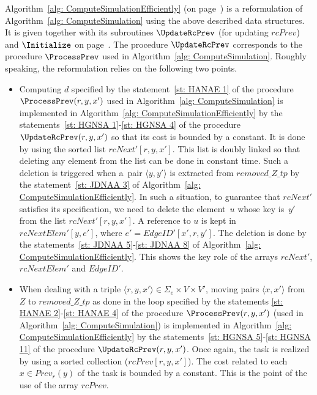 \documentclass[11pt]{article}
\def\tuple#1{\langle#1\rangle}
\newcommand{\SE}{\Sigma_e}
\newcommand{\Prev}{\mathit{Prev}}
\newcommand{\removeZ}{\textit{removed\_Z\_tp}}
\newcommand{\EdgeIDp}{\mathit{EdgeID}'}
\newcommand{\rcNextP}{\mathit{rcNext}'}
\newcommand{\rcPrev}{\mathit{rcPrev}}
\newcommand{\rcNextElemP}{\mathit{rcNextElem}'}
\begin{document}
Algorithm~\ref{alg: ComputeSimulationEfficiently} (on page~\pageref{alg: ComputeSimulationEfficiently}) is a reformulation of Algorithm~\ref{alg: ComputeSimulation} using the above described data structures. It is given together with its subroutines $\UpdateRcPrev$ (for updating $\rcPrev$) and $\Initialize$ on page~\pageref{alg: ComputeSimulationEfficiently}. The procedure $\UpdateRcPrev$ corresponds to the procedure $\ProcessPrev$ used in Algorithm~\ref{alg: ComputeSimulation}. 
%
Roughly speaking, the reformulation relies on the following two points.  
\begin{itemize}
\item Computing $d$ specified by the statement~\ref{st: HANAE 1} of the procedure $\ProcessPrev(r,y,x')$ used in Algorithm~\ref{alg: ComputeSimulation} is implemented in Algorithm~\ref{alg: ComputeSimulationEfficiently} by the statements~\ref{st: HGNSA 1}-\ref{st: HGNSA 4} of the procedure $\UpdateRcPrev(r,y,x')$ so that its cost is bounded by a constant. It is done by using the sorted list $\rcNextP[r,y,x']$. This list is doubly linked so that deleting any element from the list can be done in constant time. Such a deletion is triggered when a~pair $\tuple{y,y'}$ is extracted from $\removeZ$ by the statement~\ref{st: JDNAA 3} of Algorithm~\ref{alg: ComputeSimulationEfficiently}. In such a situation, to guarantee that $\rcNextP$ satisfies its specification, we need to delete the element~$u$ whose key is~$y'$ from the list $\rcNextP[r,y,x']$. A reference to $u$ is kept in $\rcNextElemP[y,e']$, where $e' = \EdgeIDp[x',r,y']$. The deletion is done by the statements~\ref{st: JDNAA 5}-\ref{st: JDNAA 8} of Algorithm~\ref{alg: ComputeSimulationEfficiently}. This shows the key role of the arrays $\rcNextP$, $\rcNextElemP$ and $\EdgeIDp$.  

\item When dealing with a triple $\tuple{r,y,x'} \in \SE \times V \times V'$, moving pairs $\tuple{x,x'}$ from $Z$ to $\removeZ$ as done in the loop specified by the statements \ref{st: HANAE 2}-\ref{st: HANAE 4} of the procedure $\ProcessPrev(r,y,x')$ (used in Algorithm~\ref{alg: ComputeSimulation}) is implemented in Algorithm~\ref{alg: ComputeSimulationEfficiently} by the statements~\ref{st: HGNSA 5}-\ref{st: HGNSA 11} of the procedure $\UpdateRcPrev(r,y,x')$. Once again, the task is realized by using a sorted collection ($\rcPrev[r,y,x']$). The cost related to each $x \in \Prev_r(y)$ of the task is bounded by a constant. This is the point of the use of the array $\rcPrev$.  
\end{itemize} 
\end{document}
